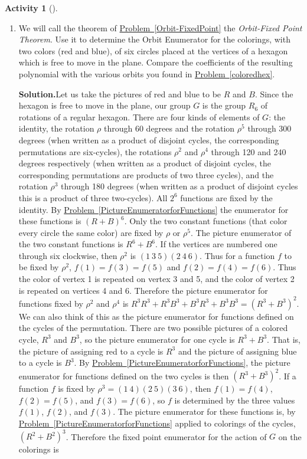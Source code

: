 \documentclass[10pt,]{book}
\theoremstyle{plain}
\theoremstyle{definition}
\newtheorem{activity}[project]{Activity}
\numberwithin{equation}{chapter}
\begin{document}
\begin{activity}[]\label{polya1}
~\par
\begin{enumerate}[label=(\alph*)]
 \item We will call the theorem of \hyperref[Orbit-FixedPoint]{Problem~\ref{Orbit-FixedPoint}} the \emph{Orbit-Fixed Point Theorem}. Use it to determine the Orbit Enumerator for the colorings, with two colors (red and blue), of six circles placed at the vertices of a hexagon which is free to move in the plane. Compare the coefficients of the resulting polynomial with the various orbits you found in \hyperref[coloredhex]{Problem~\ref{coloredhex}}.%
\par\medskip\noindent%
\textbf{Solution.}\quad Let us take the pictures of red and blue to be \(R\) and \(B\). Since the hexagon is free to move in the plane, our group \(G\) is the group \(R_6\) of rotations of a regular hexagon. There are four kinds of elements of \(G\): the identity, the rotation \(\rho\) through 60 degrees and the rotation \(\rho^5\) through 300 degrees (when written as a product of disjoint cycles, the corresponding permutations are six-cycles), the rotations \(\rho^2\) and \(\rho^4\) through 120 and 240 degrees respectively (when written as a product of disjoint cycles, the corresponding permutations are products of two three cycles), and the rotation \(\rho^3\) through 180 degrees (when written as a product of disjoint cycles this is a product of three two-cycles). All \(2^6\) functions are fixed by the identity. By \hyperref[PictureEnumeratorforFunctions]{Problem~\ref{PictureEnumeratorforFunctions}} the enumerator for these functions is \((R+B)^6\). Only the two constant functions (that color every circle the same color) are fixed by \(\rho\) or \(\rho^5\). The picture enumerator of the two constant functions is \(R^6+B^6\). If the vertices are numbered one through six clockwise, then \(\rho^2\) is \((1\ 3\ 5)(2\ 4\ 6)\). Thus for a function \(f\) to be fixed by \(\rho^2\), \(f(1)=f(3)=f(5)\) and \(f(2)=f(4)=f(6)\). Thus the color of vertex 1 is repeated on vertex 3 and 5, and the color of vertex 2 is repeated on vertices 4 and 6. Therefore the picture enumerator for functions fixed by \(\rho^2\) and \(\rho^4\) is \(R^3R^3 +R^3B^3+B^3R^3 +B^3B^3=(R^3+B^3)^2\). We can also think of this as the picture enumerator for functions defined on the cycles of the permutation. There are two possible pictures of a colored cycle, \(R^3\) and \(B^3\), so the picture enumerator for one cycle is \(R^3+B^3\). That is, the picture of assigning red to a cycle is \(R^3\) and the picture of assigning blue to a cycle is \(B^3\). By \hyperref[PictureEnumeratorforFunctions]{Problem~\ref{PictureEnumeratorforFunctions}}, the picture enumerator for functions defined on the two cycles is then \((R^3+B^3)^2\). If a function \(f\) is fixed by \(\rho^3=(1\ 4)(2\ 5)(3\ 6)\), then \(f(1)=f(4)\), \(f(2)=f(5)\), and \(f(3)=f(6)\), so \(f\) is determined by the three values \(f(1)\), \(f(2)\), and \(f(3)\). The picture enumerator for these functions is, by \hyperref[PictureEnumeratorforFunctions]{Problem~\ref{PictureEnumeratorforFunctions}} applied to colorings of the cycles, \((R^2+B^2)^3\). Therefore the fixed point enumerator for the action of \(G\) on the colorings is%

\end{enumerate}
\end{activity}
\end{document}
